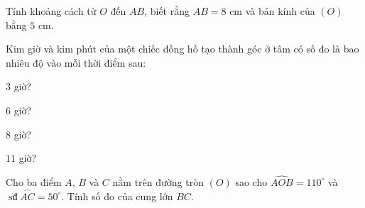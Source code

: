 \begin{practice}
\begin{questions}[resume=SBT]
\begin{questions}
            \answerline
            \answerline
            \item Tính khoảng cách từ $O$ đến $AB$, biết rằng $AB=8$ cm và bán kính của $(O)$ bằng $5$ cm.

            \answerline
            \answerline
        \end{questions}

        \item Kim giờ và kim phút của một chiếc đồng hồ tạo thành góc ở tâm có số đo là bao nhiêu độ vào mỗi thời điểm sau:
        \begin{questions}
            \item $3$ giờ?
            \item $6$ giờ?
            \item $8$ giờ?
            \item $11$ giờ?
        \end{questions}

        \answerline
        \answerline

        \item Cho ba điểm $A$, $B$ và $C$ nằm trên đường tròn $(O)$ sao cho $\widehat{AOB}=110^\circ$ và $\operatorname{sđ}\overset{\frown}{AC}=50^\circ$. Tính số đo của cung lớn $BC$.

        \answerline
        \answerline
    \end{questions}
\end{practice}

